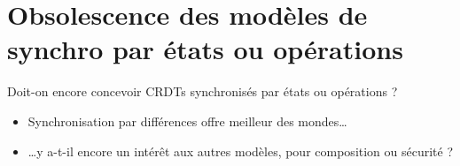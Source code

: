 \section{Obsolescence des modèles de synchro par états ou opérations}

\begin{frame}{Doit-on encore concevoir CRDTs synchronisés par états ou opérations ?}
    \begin{table}[!ht]
    \end{table}
    \begin{itemize}
      \item Synchronisation par différences offre meilleur des mondes\dots
      \item \dots y a-t-il encore un intérêt aux autres modèles, \eg pour composition ou sécurité ?
    \end{itemize}
  \end{frame}
